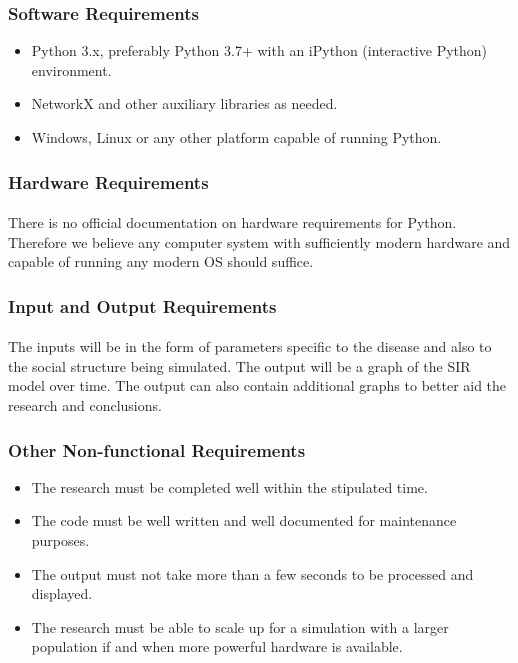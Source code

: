 \documentclass[14pt, a4paper]{extarticle}
\begin{document}
            \subsubsection{Software Requirements}
                \begin{itemize}
                    \item Python 3.x, preferably Python 3.7+ with an iPython (interactive Python) environment.
                    \item NetworkX and other auxiliary libraries as needed.
                    \item Windows, Linux or any other platform capable of running Python.
                \end{itemize}
            
            \subsubsection{Hardware Requirements}
                \paragraph{} There is no official documentation on hardware requirements for Python. Therefore we believe any computer system with sufficiently modern hardware and capable of running any modern OS should suffice.
            
            \subsubsection{Input and Output Requirements}
                \paragraph{} The inputs will be in the form of parameters specific to the disease and also to the social structure being simulated. The output will be a graph of the SIR model over time. The output can also contain additional graphs to better aid the research and conclusions.
            
            \subsubsection{Other Non-functional Requirements}
                \begin{itemize}
                    \item The research must be completed well within the stipulated time.
                    \item The code must be well written and well documented for maintenance purposes.
                    \item The output must not take more than a few seconds to be processed and displayed.
                    \item The research must be able to scale up for a simulation with a larger population if and when more powerful hardware is available.
                \end{itemize}
    
\end{document}
